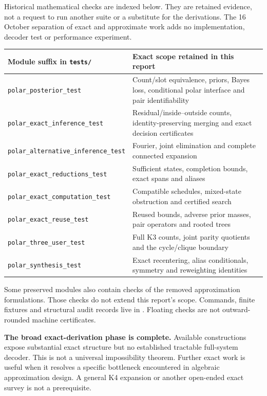 \documentclass[10pt,a4paper]{article}
\begin{document}
Historical mathematical checks are indexed below. They are retained evidence, not a request to run another
suite or a substitute for the derivations. The 16 October separation of exact and approximate work adds no
implementation, decoder test or performance experiment.
\begin{center}\small
\begin{tabularx}{\textwidth}{@{}lY@{}}\toprule
Module suffix in \texttt{tests/} & Exact scope retained in this report\\\midrule
\texttt{polar\_posterior\_test} & Count/slot equivalence, priors, Bayes loss, conditional polar interface and pair identifiability\\
\texttt{polar\_exact\_inference\_test} & Residual/inside--outside counts, identity-preserving merging and exact decision certificates\\
\texttt{polar\_alternative\_inference\_test} & Fourier, joint elimination and complete connected expansion\\
\texttt{polar\_exact\_reductions\_test} & Sufficient states, completion bounds, exact spans and aliases\\
\texttt{polar\_exact\_computation\_test} & Compatible schedules, mixed-state obstruction and certified search\\
\texttt{polar\_exact\_reuse\_test} & Reused bounds, adverse prior masses, pair operators and rooted trees\\
\texttt{polar\_three\_user\_test} & Full K3 counts, joint parity quotients and the cycle/clique boundary\\
\texttt{polar\_synthesis\_test} & Exact recentering, alias conditionals, symmetry and reweighting identities\\\bottomrule
\end{tabularx}
\end{center}
Some preserved modules also contain checks of the removed approximation formulations. Those checks do not
extend this report's scope. Commands, finite fixtures and structural audit records live in
. Floating checks are not outward-rounded machine certificates.

\textbf{The broad exact-derivation phase is complete.} Available constructions expose substantial exact
structure but no established tractable full-system decoder. This is not a universal impossibility theorem.
Further exact work is useful when it resolves a specific bottleneck encountered in algebraic approximation
design. A general K4 expansion or another open-ended exact survey is not a prerequisite.
\end{document}
